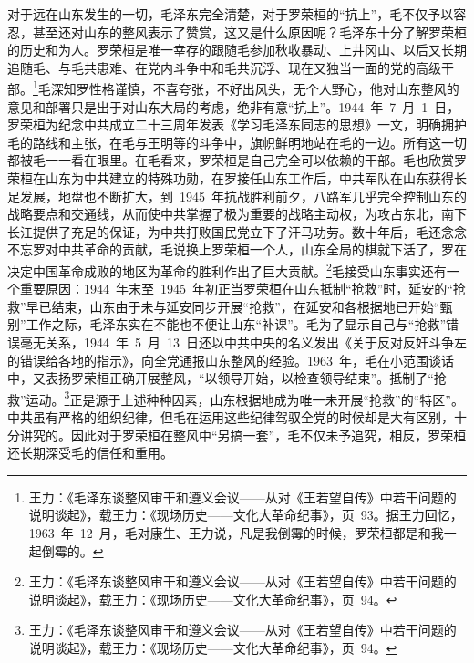 对于远在山东发生的一切，毛泽东完全清楚，对于罗荣桓的“抗上”，毛不仅予以容忍，甚至还对山东的整风表示了赞赏，这又是什么原因呢？毛泽东十分了解罗荣桓的历史和为人。罗荣桓是唯一幸存的跟随毛参加秋收暴动、上井冈山、以后又长期追随毛、与毛共患难、在党内斗争中和毛共沉浮、现在又独当一面的党的高级干部。\footnote{王力：《毛泽东谈整风审干和遵义会议——从对《王若望自传》中若干问题的说明谈起》，载王力：《现场历史——文化大革命纪事》，页~93。据王力回忆，1963~年~12~月，毛对康生、王力说，凡是我倒霉的时候，罗荣桓都是和我一起倒霉的。}毛深知罗性格谨慎，不喜夸张，不好出风头，无个人野心，他对山东整风的意见和部署只是出于对山东大局的考虑，绝非有意“抗上”。1944~年~7~月~1~日，罗荣桓为纪念中共成立二十三周年发表《学习毛泽东同志的思想》一文，明确拥护毛的路线和主张，在毛与王明等的斗争中，旗帜鲜明地站在毛的一边。所有这一切都被毛一一看在眼里。在毛看来，罗荣桓是自己完全可以依赖的干部。毛也欣赏罗荣桓在山东为中共建立的特殊功勋，在罗接任山东工作后，中共军队在山东获得长足发展，地盘也不断扩大，到~1945~年抗战胜利前夕，八路军几乎完全控制山东的战略要点和交通线，从而使中共掌握了极为重要的战略主动权，为攻占东北，南下长江提供了充足的保证，为中共打败国民党立下了汗马功劳。数十年后，毛还念念不忘罗对中共革命的贡献，毛说换上罗荣桓一个人，山东全局的棋就下活了，罗在决定中国革命成败的地区为革命的胜利作出了巨大贡献。\footnote{王力：《毛泽东谈整风审干和遵义会议——从对《王若望自传》中若干问题的说明谈起》，载王力：《现场历史——文化大革命纪事》，页~94。}毛接受山东事实还有一个重要原因：1944~年末至~1945~年初正当罗荣桓在山东抵制“抢救”时，延安的“抢救”早已结束，山东由于未与延安同步开展“抢救”，在延安和各根据地已开始“甄别”工作之际，毛泽东实在不能也不便让山东“补课”。毛为了显示自己与“抢救”错误毫无关系，1944~年~5~月~13~日还以中共中央的名义发出《关于反对反奸斗争左的错误给各地的指示》，向全党通报山东整风的经验。1963~年，毛在小范围谈话中，又表扬罗荣桓正确开展整风，“以领导开始，以检查领导结束”。抵制了“抢救”运动。\footnote{王力：《毛泽东谈整风审干和遵义会议——从对《王若望自传》中若干问题的说明谈起》，载王力：《现场历史——文化大革命纪事》，页~94。}正是源于上述种种因素，山东根据地成为唯一未开展“抢救”的“特区”。中共虽有严格的组织纪律，但毛在运用这些纪律驾驭全党的时候却是大有区别，十分讲究的。因此对于罗荣桓在整风中“另搞一套”，毛不仅未予追究，相反，罗荣桓还长期深受毛的信任和重用。
